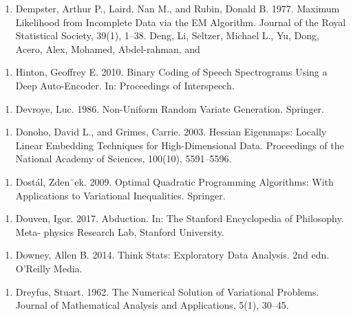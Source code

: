 \begin{enumerate}
\item Dempster, Arthur P., Laird, Nan M., and Rubin, Donald B. 1977. Maximum Likelihood from Incomplete Data via the EM Algorithm. Journal of the Royal Statistical Society, 39(1), 1–38. Deng, Li, Seltzer, Michael L., Yu, Dong, Acero, Alex, Mohamed, Abdel-rahman, and
\end{enumerate}

\begin{enumerate}
\item Hinton, Geoffrey E. 2010. Binary Coding of Speech Spectrograms Using a Deep Auto-Encoder. In: Proceedings of Interspeech.
\end{enumerate}

\begin{enumerate}
\item Devroye, Luc. 1986. Non-Uniform Random Variate Generation. Springer.
\end{enumerate}

\begin{enumerate}
\item Donoho, David L., and Grimes, Carrie. 2003. Hessian Eigenmaps: Locally Linear Embedding Techniques for High-Dimensional Data. Proceedings of the National Academy of Sciences, 100(10), 5591–5596.
\end{enumerate}

\begin{enumerate}
\item Dostál, Zden˘ek. 2009. Optimal Quadratic Programming Algorithms: With Applications to Variational Inequalities. Springer.
\end{enumerate}

\begin{enumerate}
\item Douven, Igor. 2017. Abduction. In: The Stanford Encyclopedia of Philosophy. Meta- physics Research Lab, Stanford University.
\end{enumerate}

\begin{enumerate}
\item Downey, Allen B. 2014. Think Stats: Exploratory Data Analysis. 2nd edn. O’Reilly Media.
\end{enumerate}

\begin{enumerate}
\item Dreyfus, Stuart. 1962. The Numerical Solution of Variational Problems. Journal of Mathematical Analysis and Applications, 5(1), 30–45.
\end{enumerate}

